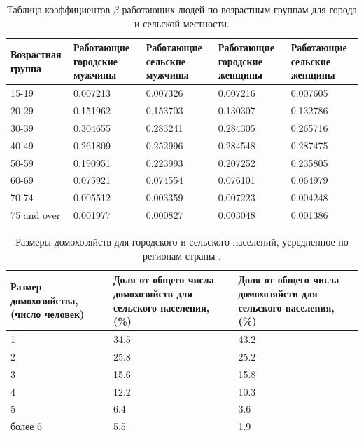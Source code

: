 \documentclass[14pt,a4paper]{article}
\begin{document}
\begin{table}[h!]
	\centering
	\setlength{\arrayrulewidth}{1pt}
	\renewcommand{\arraystretch}{1.5}
	\begin{tabularx}{\linewidth}{|X|X|X|X|X|}
		\hline
		{Возрастная группа} &
		{Работающие городские мужчины} &
		{Работающие сельские мужчины}  & 
		{Работающие городские женщины} &
		{Работающие сельские женщины}  \\ \hline
		15-19 & 0.007213 & 0.007326 & 0.007216 & 0.007605 \\ \hline
		20-29 & 0.151962 & 0.153703 & 0.130307 & 0.132786 \\ \hline
		30-39 & 0.304655 & 0.283241 & 0.284305 & 0.265716 \\ \hline
		40-49 & 0.261809 & 0.252996 & 0.284548 & 0.287475 \\ \hline
		50-59 & 0.190951 & 0.223993 & 0.207252 & 0.235805 \\ \hline
		60-69 & 0.075921 & 0.074554 & 0.076101 & 0.064979 \\ \hline
		70-74 & 0.005512 & 0.003359 & 0.007223 & 0.004248 \\ \hline
		75 and over & 0.001977 & 0.000827 & 0.003048 & 0.001386 \\ \hline
	\end{tabularx}
	\caption{Таблица коэффициентов $\beta$  работающих людей по возрастным группам для города и сельской местности.}
	\label{coeffааа}
\end{table}



\begin{table}[h!]
	\centering
	\setlength{\arrayrulewidth}{1pt}
	\renewcommand{\arraystretch}{1.5}
	\begin{tabularx}{\linewidth}{|X|X|X|}
		
		\hline
		{Размер домохозяйства, (число человек)} &
		{Доля от общего числа домохозяйств для сельского населения, (\%)} &
		{Доля от общего числа домохозяйств для сельского населения, (\%)} \\
		\hline
		1 & 34.5 & 43.2  \\
		\hline
		2 & 25.8 & 25.2  \\
		\hline
		3 & 15.6 & 15.8  \\
		\hline
		4 & 12.2 & 10.3  \\
		\hline
		5 & 6.4 & 3.6  \\
		\hline
		более 6 & 5.5 & 1.9  \\
		\hline
	\end{tabularx}
	
	\caption{Размеры домохозяйств для городского и сельского населений, усредненное по регионам страны  \cite{rosstat}.}
	\label{tab: 111}
\end{table}
\end{document}
